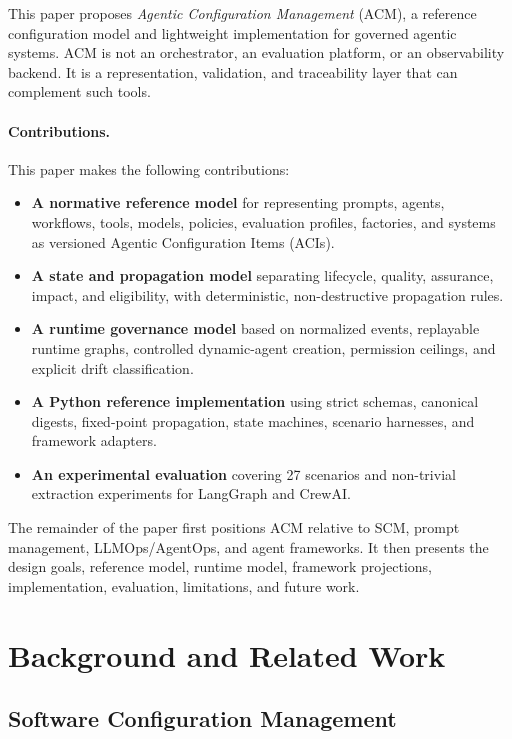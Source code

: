 \documentclass[10pt]{article}
\begin{document}
This paper proposes \emph{Agentic Configuration Management} (ACM), a reference configuration model and lightweight implementation for governed agentic systems. ACM is not an orchestrator, an evaluation platform, or an observability backend. It is a representation, validation, and traceability layer that can complement such tools.

\paragraph{Contributions.}
This paper makes the following contributions:

\begin{itemize}[leftmargin=*]
  \item \textbf{A normative reference model} for representing prompts, agents, workflows, tools, models, policies, evaluation profiles, factories, and systems as versioned Agentic Configuration Items (ACIs).
  \item \textbf{A state and propagation model} separating lifecycle, quality, assurance, impact, and eligibility, with deterministic, non-destructive propagation rules.
  \item \textbf{A runtime governance model} based on normalized events, replayable runtime graphs, controlled dynamic-agent creation, permission ceilings, and explicit drift classification.
  \item \textbf{A Python reference implementation} using strict schemas, canonical digests, fixed-point propagation, state machines, scenario harnesses, and framework adapters.
  \item \textbf{An experimental evaluation} covering 27 scenarios and non-trivial extraction experiments for LangGraph and CrewAI.
\end{itemize}

The remainder of the paper first positions ACM relative to SCM, prompt management, LLMOps/AgentOps, and agent frameworks. It then presents the design goals, reference model, runtime model, framework projections, implementation, evaluation, limitations, and future work.

\section{Background and Related Work}
\label{sec:related}

\subsection{Software Configuration Management}
\end{document}

